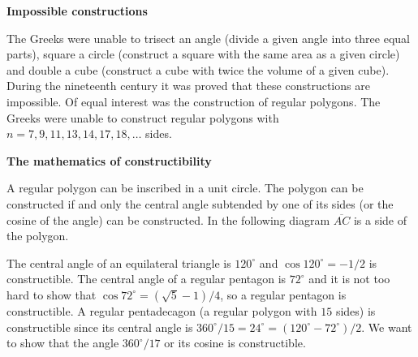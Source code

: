 \documentclass[a4paper,11pt]{article}
\begin{document}
\begin{center}
\end{center}

\textbf{Impossible constructions}

The Greeks were unable to trisect an angle (divide a given angle into three equal parts), square a circle (construct a square with the same area as a given circle) and double a cube (construct a cube with twice the volume of a given cube). During the nineteenth century it was proved that these constructions are impossible. Of equal interest was the construction of regular polygons. The Greeks were unable to construct regular polygons with $n=7,9,11,13,14,17,18,\ldots$ sides.

\textbf{The mathematics of constructibility}

A regular polygon can be inscribed in a unit circle. The polygon can be constructed if and only the central angle subtended by one of its sides (or the cosine of the angle) can be constructed. In the following diagram $\overline{AC}$ is a side of the polygon.
\begin{center}
\end{center}
The central angle of an equilateral triangle is $120^\circ$ and $\cos 120^\circ=-1/2$ is constructible. The central angle of a regular pentagon is $72^\circ$ and it is not too hard to show that $\cos 72^{\circ}=(\sqrt{5}-1)/4$, so a regular pentagon is constructible. A regular pentadecagon (a regular polygon with $15$ sides) is constructible since its central angle is $360^\circ/15=24^\circ=(120^\circ-72^\circ)/2$. We want to show that the angle $360^\circ/17$ or its cosine is constructible.
\end{document}
